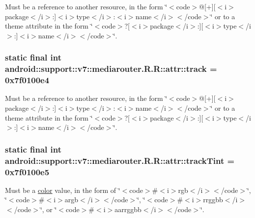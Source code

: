 Must be a reference to another resource, in the form \char`\"{}$<$code$>$@\mbox{[}+\mbox{]}\mbox{[}$<$i$>$package$<$/i$>$:\mbox{]}$<$i$>$type$<$/i$>$:$<$i$>$name$<$/i$>$$<$/code$>$\char`\"{} or to a theme attribute in the form \char`\"{}$<$code$>$?\mbox{[}$<$i$>$package$<$/i$>$:\mbox{]}\mbox{[}$<$i$>$type$<$/i$>$:\mbox{]}$<$i$>$name$<$/i$>$$<$/code$>$\char`\"{}. \hypertarget{classandroid_1_1support_1_1v7_1_1mediarouter_1_1_r_1_1attr_d25a8d80921fda1c9538f55303bd7baa}{
\subsubsection[{track}]{\setlength{\rightskip}{0pt plus 5cm}static final int android::support::v7::mediarouter.R.R::attr::track = 0x7f0100e4}}
\label{classandroid_1_1support_1_1v7_1_1mediarouter_1_1_r_1_1attr_d25a8d80921fda1c9538f55303bd7baa}


Must be a reference to another resource, in the form \char`\"{}$<$code$>$@\mbox{[}+\mbox{]}\mbox{[}$<$i$>$package$<$/i$>$:\mbox{]}$<$i$>$type$<$/i$>$:$<$i$>$name$<$/i$>$$<$/code$>$\char`\"{} or to a theme attribute in the form \char`\"{}$<$code$>$?\mbox{[}$<$i$>$package$<$/i$>$:\mbox{]}\mbox{[}$<$i$>$type$<$/i$>$:\mbox{]}$<$i$>$name$<$/i$>$$<$/code$>$\char`\"{}. \hypertarget{classandroid_1_1support_1_1v7_1_1mediarouter_1_1_r_1_1attr_848d1c20420449814af102ac6d6bd4a2}{
\subsubsection[{trackTint}]{\setlength{\rightskip}{0pt plus 5cm}static final int android::support::v7::mediarouter.R.R::attr::trackTint = 0x7f0100e5}}
\label{classandroid_1_1support_1_1v7_1_1mediarouter_1_1_r_1_1attr_848d1c20420449814af102ac6d6bd4a2}


Must be a \hyperlink{classandroid_1_1support_1_1v7_1_1mediarouter_1_1_r_1_1color}{color} value, in the form of \char`\"{}$<$code$>$\#$<$i$>$rgb$<$/i$>$$<$/code$>$\char`\"{}, \char`\"{}$<$code$>$\#$<$i$>$argb$<$/i$>$$<$/code$>$\char`\"{}, \char`\"{}$<$code$>$\#$<$i$>$rrggbb$<$/i$>$$<$/code$>$\char`\"{}, or \char`\"{}$<$code$>$\#$<$i$>$aarrggbb$<$/i$>$$<$/code$>$\char`\"{}. 

